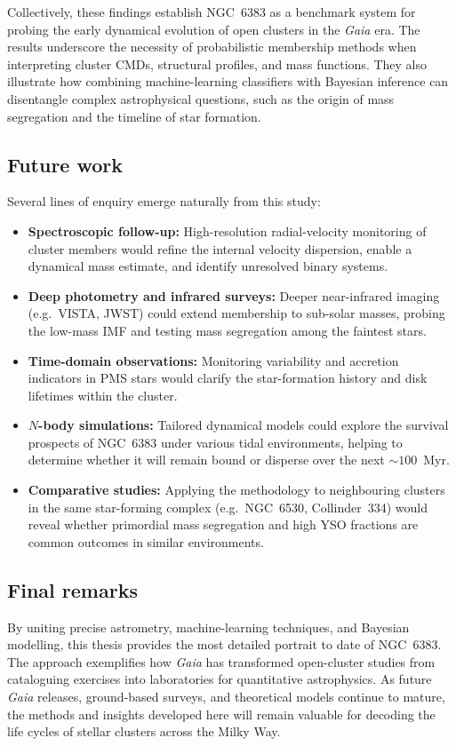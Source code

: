 \documentclass[../main.tex]{subfiles}
\begin{document}
Collectively, these findings establish NGC~6383 as a benchmark system for probing the early dynamical evolution of open clusters in the \textit{Gaia} era. The results underscore the necessity of probabilistic membership methods when interpreting cluster CMDs, structural profiles, and mass functions. They also illustrate how combining machine-learning classifiers with Bayesian inference can disentangle complex astrophysical questions, such as the origin of mass segregation and the timeline of star formation.

\subsection{Future work}
\label{subsec:conclusions-future}

Several lines of enquiry emerge naturally from this study:
\begin{itemize}
  \item \textbf{Spectroscopic follow-up:} High-resolution radial-velocity monitoring of cluster members would refine the internal velocity dispersion, enable a dynamical mass estimate, and identify unresolved binary systems.
  \item \textbf{Deep photometry and infrared surveys:} Deeper near-infrared imaging (e.g.\ VISTA, JWST) could extend membership to sub-solar masses, probing the low-mass IMF and testing mass segregation among the faintest stars.
  \item \textbf{Time-domain observations:} Monitoring variability and accretion indicators in PMS stars would clarify the star-formation history and disk lifetimes within the cluster.
  \item \textbf{$N$-body simulations:} Tailored dynamical models could explore the survival prospects of NGC~6383 under various tidal environments, helping to determine whether it will remain bound or disperse over the next $\sim100$~Myr.
  \item \textbf{Comparative studies:} Applying the methodology to neighbouring clusters in the same star-forming complex (e.g.\ NGC~6530, Collinder~334) would reveal whether primordial mass segregation and high YSO fractions are common outcomes in similar environments.
\end{itemize}

\subsection{Final remarks}
\label{subsec:conclusions-final}

By uniting precise astrometry, machine-learning techniques, and Bayesian modelling, this thesis provides the most detailed portrait to date of NGC~6383. The approach exemplifies how \textit{Gaia} has transformed open-cluster studies from cataloguing exercises into laboratories for quantitative astrophysics. As future \textit{Gaia} releases, ground-based surveys, and theoretical models continue to mature, the methods and insights developed here will remain valuable for decoding the life cycles of stellar clusters across the Milky Way.

\biblio
\end{document}
